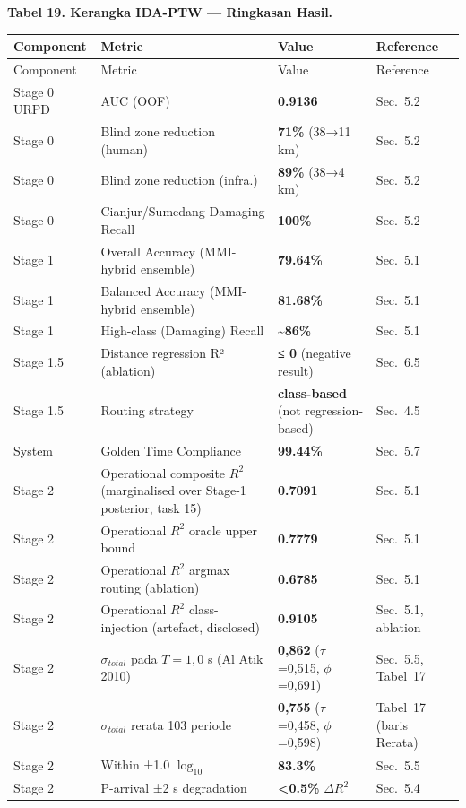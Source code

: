 \documentclass[10pt]{article}
\begin{document}
\par\vspace{16pt}\noindent\begingroup\centering\fontsize{8}{10}\selectfont\textbf{Tabel 19. Kerangka IDA-PTW --- Ringkasan Hasil.}\par\endgroup\vspace{6pt}
\begin{longtable}[]{@{}>{\raggedright\arraybackslash}p{2cm}>{\raggedright\arraybackslash}p{4cm}>{\centering\arraybackslash}p{2.5cm}>{\raggedright\arraybackslash}p{3.5cm}@{}}
\toprule
Component & Metric & Value & Reference \\
\midrule
\endfirsthead
\toprule
Component & Metric & Value & Reference \\
\midrule
\endhead
\bottomrule
\endlastfoot
Stage 0 URPD & AUC (OOF) & \textbf{0.9136} & Sec.~5.2 \\
Stage 0 & Blind zone reduction (human) & \textbf{71\%} (38→11 km) & Sec.~5.2 \\
Stage 0 & Blind zone reduction (infra.) & \textbf{89\%} (38→4 km) & Sec.~5.2 \\
Stage 0 & Cianjur/Sumedang Damaging Recall & \textbf{100\%} & Sec.~5.2 \\
Stage 1 & Overall Accuracy (MMI-hybrid ensemble) & \textbf{79.64\%} & Sec.~5.1 \\
Stage 1 & Balanced Accuracy (MMI-hybrid ensemble) & \textbf{81.68\%} & Sec.~5.1 \\
Stage 1 & High-class (Damaging) Recall & \textbf{\textasciitilde86\%} & Sec.~5.1 \\
Stage 1.5 & Distance regression R² (ablation) & \textbf{≤ 0} (negative result) & Sec.~6.5 \\
Stage 1.5 & Routing strategy & \textbf{class-based} (not regression-based) & Sec.~4.5 \\
System & Golden Time Compliance & \textbf{99.44\%} & Sec.~5.7 \\
Stage 2 & Operational composite \(R^2\) (marginalised over Stage-1 posterior, task 15) & \textbf{0.7091} & Sec.~5.1 \\
Stage 2 & Operational \(R^2\) oracle upper bound & \textbf{0.7779} & Sec.~5.1 \\
Stage 2 & Operational \(R^2\) argmax routing (ablation) & \textbf{0.6785} & Sec.~5.1 \\
Stage 2 & Operational \(R^2\) class-injection (artefact, disclosed) & \textbf{0.9105} & Sec.~5.1, ablation \\
Stage 2 & \(\sigma_{total}\) pada \(T = 1,0\) s (Al Atik 2010) & \textbf{0,862} (\(\tau\)=0,515, \(\phi\)=0,691) & Sec.~5.5, Tabel~17 \\
Stage 2 & \(\sigma_{total}\) rerata 103 periode & \textbf{0,755} (\(\tau\)=0,458, \(\phi\)=0,598) & Tabel~17 (baris Rerata) \\
Stage 2 & Within ±1.0 \(\log_{10}\) & \textbf{83.3\%} & Sec.~5.5 \\
Stage 2 & P-arrival ±2 s degradation & \textbf{\textless0.5\%} \(\Delta R^2\) & Sec.~5.4 \\
\end{longtable}
\end{document}
